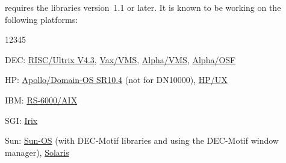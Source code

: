 \KUIPMotif{} requires the \Motif{} libraries version~1.1 or later.
It is known to be working on the following platforms:
\begin{DL}{12345}
\item[DEC:]
\underline{\vphantom{p}RISC/Ultrix V4.3}, 
\underline{\vphantom{p}Vax/VMS},
\underline{Alpha/VMS},
\underline{Alpha/OSF}
\item[HP:]
\underline{Apollo/Domain-OS SR10.4} (not for DN10000),
\underline{\vphantom{p}HP/UX}
\item[IBM:]
\underline{\vphantom{p}RS-6000/AIX}
\item[SGI:]
\underline{\vphantom{p}Irix}
\item[Sun:]
\underline{\vphantom{p}Sun-OS} 
(with DEC-Motif libraries and using the DEC-Motif window manager),
\underline{\vphantom{p}Solaris} 
\end{DL}



